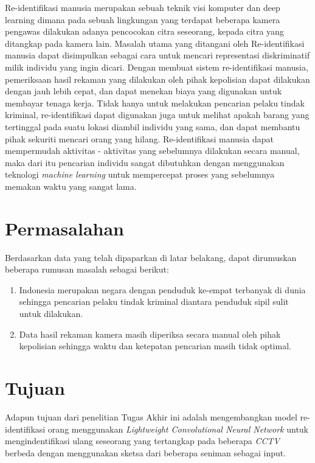 Re-identifikasi manusia merupakan sebuah teknik visi komputer dan deep learning dimana pada sebuah lingkungan yang terdapat beberapa kamera pengawas dilakukan adanya pencocokan citra seseorang, kepada citra yang ditangkap pada kamera lain. Masalah utama yang ditangani oleh Re-identifikasi manusia dapat disimpulkan sebagai cara untuk mencari representasi diskriminatif milik individu yang ingin dicari. Dengan membuat sistem re-identifikasi manusia, pemeriksaan hasil rekaman yang dilakukan oleh pihak kepolisian dapat dilakukan dengan jauh lebih cepat, dan dapat menekan biaya yang digunakan untuk membayar tenaga kerja. Tidak hanya  untuk melakukan pencarian pelaku tindak kriminal, re-identifikasi dapat digunakan juga untuk melihat apakah barang yang tertinggal pada suatu lokasi diambil individu yang sama, dan dapat membantu pihak sekuriti mencari orang yang hilang. Re-identifikasi manusia dapat mempermudah aktivitas - aktivitas yang sebelumnya dilakukan secara manual, maka dari itu pencarian individu sangat dibutuhkan dengan menggunakan teknologi \textit{machine learning} untuk mempercepat proses yang sebelumnya memakan waktu yang sangat lama.
\vspace{1ex} 

\section{Permasalahan}
\vspace{1ex}
Berdasarkan data yang telah dipaparkan di latar belakang, dapat dirumuskan beberapa rumusan masalah sebagai berikut:
\begin{enumerate}
	\vspace{-1.3mm}
	\item Indonesia merupakan negara dengan penduduk ke-empat terbanyak di dunia sehingga pencarian pelaku tindak kriminal diantara penduduk sipil sulit untuk dilakukan.
	\vspace{-2mm}
	\item Data hasil rekaman kamera masih diperiksa secara manual oleh pihak kepolisian sehingga waktu dan ketepatan pencarian masih tidak optimal.
\end{enumerate}

\section{Tujuan}
\vspace{1ex}

Adapun tujuan dari penelitian Tugas Akhir ini adalah mengembangkan model re-identifikasi orang menggunakan \textit{Lightweight Convolutional Neural Network} untuk mengindentifikasi ulang seseorang yang tertangkap pada beberapa \textit{CCTV} berbeda dengan menggunakan sketsa dari beberapa seniman sebagai input.

